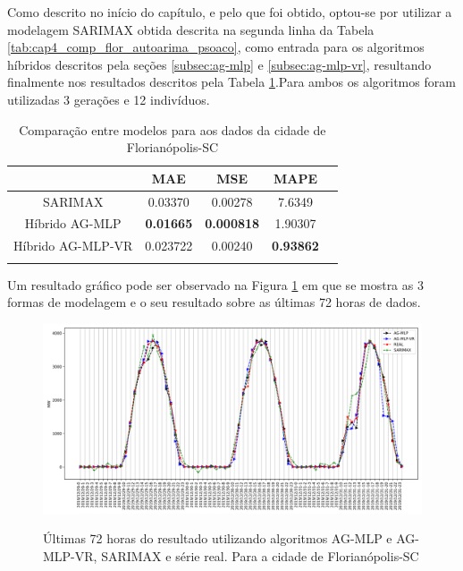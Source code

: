 Como descrito no início do capítulo, e pelo que foi obtido, optou-se por utilizar a modelagem SARIMAX obtida descrita na segunda linha da Tabela \ref{tab:cap4_comp_flor_autoarima_psoaco}, como entrada para os algoritmos híbridos descritos pela seções \ref{subsec:ag-mlp} e \ref{subsec:ag-mlp-vr}, resultando finalmente nos resultados descritos pela Tabela \ref{tab:cap4_comp_flor_agmlp_agmlpvr}.Para ambos os algoritmos foram utilizadas 3 gerações e 12 indivíduos.

\begin{table}[htbp]
\caption{Comparação entre modelos para aos dados da cidade de Florianópolis-SC}
\begin{center}
\begin{tabular}{ccccc}
                & MAE & MSE & MAPE \\\hline
SARIMAX         & 0.03370 & 0.00278 & 7.6349 \\\hline
Híbrido AG-MLP  & \textbf{0.01665} & \textbf{0.000818} & 1.90307 \\\hline
Híbrido AG-MLP-VR & 0.023722 & 0.00240 & \textbf{0.93862} \\\hline
\label{tab:cap4_comp_flor_agmlp_agmlpvr}
\end{tabular}
\end{center}
\end{table}

Um resultado gráfico pode ser observado na Figura \ref{fig:cap4_flor_3_days_hibrids} em que se mostra as 3 formas de modelagem e o seu resultado sobre as últimas 72 horas de dados.

\begin{figure}[!htbp]
    \centering
    \caption{Últimas 72 horas do resultado utilizando algoritmos AG-MLP e AG-MLP-VR, SARIMAX e série real. Para a cidade de Florianópolis-SC}
    \includegraphics[width=\textwidth]{Figuras/cap4/comparison_hibrids_fl.png}
    \label{fig:cap4_flor_3_days_hibrids}
\end{figure}

